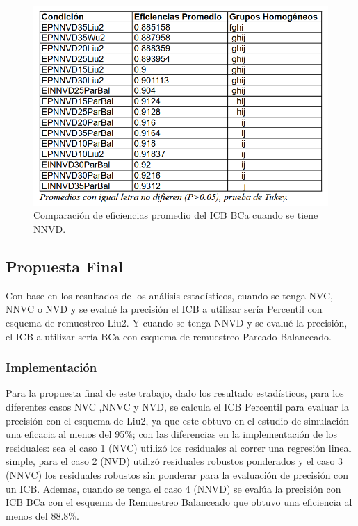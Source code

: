 \begin{figure}[ht] 
	\centering 
	\includegraphics[width=0.76\linewidth]{img/CompEfic_PromICB_BCa_NNVD.png} 
	\caption{Comparación de eficiencias promedio del ICB BCa cuando se tiene NNVD.} 
	\label{fig:CompEfic_PromICB_BCa_NNVD}
\end{figure}
\FloatBarrier



\newpage

\subsection{Propuesta Final}

Con base en los resultados de los análisis estadísticos, cuando se tenga NVC, NNVC o NVD y se evalué la precisión el ICB a utilizar sería Percentil con esquema de remuestreo Liu2. Y cuando se tenga NNVD y se evalué la precisión, el ICB a utilizar sería BCa con esquema de remuestreo Pareado Balanceado.


\subsubsection{Implementación}


Para la propuesta final de este trabajo, dado los resultado estadísticos, para los diferentes casos NVC ,NNVC y NVD, se calcula el ICB Percentil para evaluar la precisión con el esquema de Liu2, ya que este obtuvo en el estudio de simulación una eficacia al menos del 95\%; con las diferencias en la implementación de los residuales: sea el caso 1 (NVC) utilizó los residuales al correr una regresión lineal simple, para el caso 2 (NVD) utilizó residuales robustos ponderados y el caso 3 (NNVC) los residuales robustos sin ponderar para la evaluación de precisión con un ICB. Ademas, cuando se tenga el caso 4 (NNVD) se evalúa la precisión con ICB BCa con el esquema de Remuestreo Balanceado que obtuvo una eficiencia al menos del 88.8\%.\\

